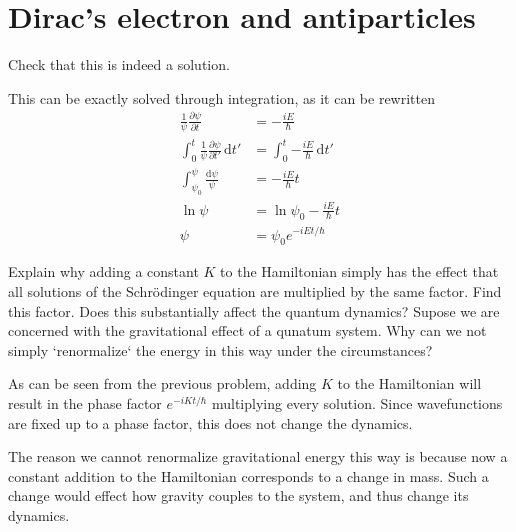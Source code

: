 \documentclass[../road-to-reality.tex]{subfiles}
\begin{document}
	\printanswers
	
	\section{Dirac's electron and antiparticles}
	
	\begin{questions}
		\question Check that this is indeed a solution.
		
		\begin{solution}
			This can be exactly solved through integration, as it can be rewritten
			\begin{align*}
				\frac{1}{\psi}\frac{\partial\psi}{\partial t} &= {-\frac{iE}{\hbar}} \\
				\int_0^t\frac{1}{\psi}\frac{\partial\psi}{\partial t'}\,\mathrm{d}t' &= \int_0^t{-\frac{iE}{\hbar}}\,\mathrm{d}t' \\
				\int_{\psi_0}^{\psi}\frac{\mathrm{d}\psi}{\psi} &= {-\frac{iE}{\hbar}}t \\
				\ln\psi &= \ln\psi_0 - \frac{iE}{\hbar}t \\
				\psi &= \psi_0e^{-iEt/\hbar}
			\end{align*}
		\end{solution}
		
		\question Explain why adding a constant $K$ to the Hamiltonian simply has the effect that all solutions of the Schr\"odinger equation are multiplied by the same factor. Find this factor. Does this substantially affect the quantum dynamics? Supose we are concerned with the gravitational effect of a qunatum system. Why can we not simply `renormalize` the energy in this way under the circumstances?
	
		\begin{solution}
			As can be seen from the previous problem, adding $K$ to the Hamiltonian will result in the phase factor $e^{-iKt/\hbar}$ multiplying every solution. Since wavefunctions are fixed up to a phase factor, this does not change the dynamics.
			
			The reason we cannot renormalize gravitational energy this way is because now a constant addition to the Hamiltonian corresponds to a change in mass. Such a change would effect how gravity couples to the system, and thus change its dynamics.
		\end{solution}
	
	\end{questions}
\end{document}
